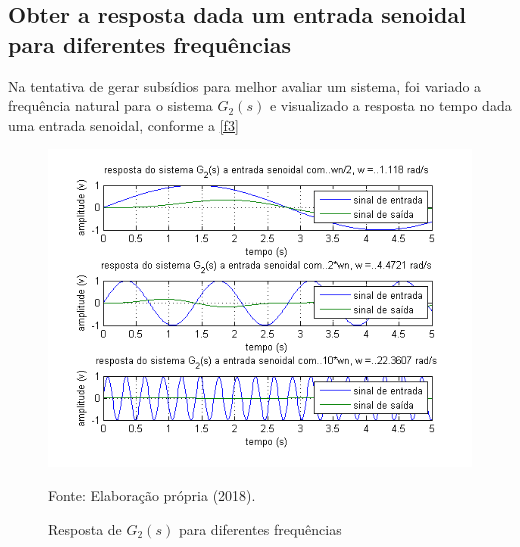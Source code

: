\subsection{Obter a resposta dada um entrada senoidal para diferentes frequências}

Na tentativa de gerar subsídios para melhor avaliar um sistema, foi variado a frequência natural para o sistema $G_2(s)$ e visualizado a resposta no tempo dada uma entrada senoidal, conforme a \autoref{f3}
\\
\begin{figure}[h!]
    \centering
    \caption{Resposta de $G_2(s)$ para diferentes frequências}
    \includegraphics[scale=0.55]{img/task_7_03.png}
    \label{f3}
    \begin{flushleft}
        Fonte: Elaboração própria (2018).
    \end{flushleft}
\end{figure}

